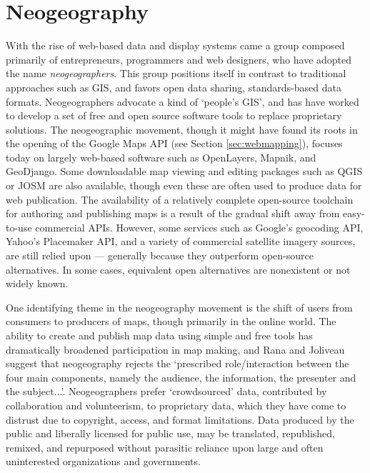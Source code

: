\documentclass[11pt,oneside,notitlepage]{report}
\begin{document}
\section{Neogeography}
\label{sec:neogeography}

With the rise of web-based data and display systems came a group composed primarily of entrepreneurs, programmers and web designers, who have adopted the name \emph{neogeographers}. This group positions itself in contrast to traditional approaches such as GIS, and favors open data sharing, standards-based data formats. Neogeographers advocate a kind of `people's GIS', and has have worked to develop a set of free and open source software tools to replace proprietary solutions. The neogeographic movement, though it might have found its roots in the opening of the Google Maps \ac{API} (see Section \ref{sec:webmapping}), focuses today on largely web-based software such as OpenLayers, Mapnik, and GeoDjango. Some downloadable map viewing and editing packages such as QGIS or \ac{JOSM} are also available, though even these are often used to produce data for web publication. The availability of a relatively complete open-source toolchain for authoring and publishing maps is a result of the gradual shift away from easy-to-use commercial \ac{API}s. \cite{rana2009neogeography} However, some services such as Google's geocoding \ac{API}, Yahoo's Placemaker \ac{API}, and a variety of commercial satellite imagery sources, are still relied upon --- generally because they outperform open-source alternatives. In some cases, equivalent open alternatives are nonexistent or not widely known.

One identifying theme in the neogeography movement is the shift of users from consumers to producers of maps, though primarily in the online world. \cite{oconnor2008maps} The ability to create and publish map data using simple and free tools has dramatically broadened participation in map making, and Rana and Joliveau suggest that neogeography rejects the `prescribed role/interaction between the four main components, namely the audience, the information, the presenter and the subject...'. \cite{rana2009neogeography} Neogeographers prefer `crowdsourced' data, contributed by collaboration and volunteerism, to proprietary data, which they have come to distrust due to copyright, access, and format limitations. Data produced by the public and liberally licensed for public use, may be translated, republished, remixed, and repurposed without parasitic reliance upon large and often uninterested organizations and governments. 
\end{document}
